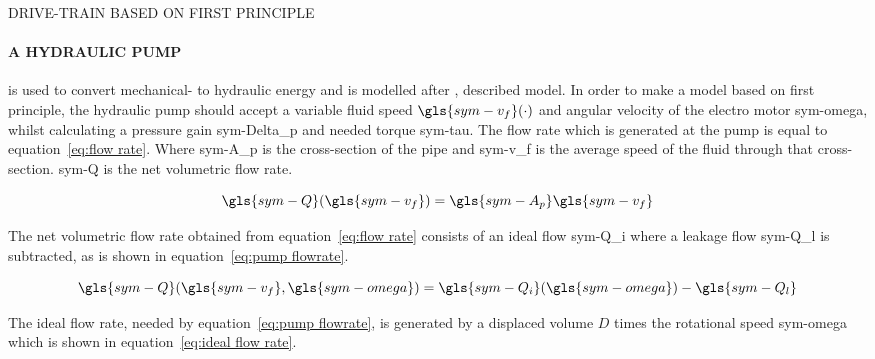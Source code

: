 \begin{RoyalFigure}[!htb, label=fig:propulsionsystemmodel]{DRIVE-TRAIN BASED ON FIRST PRINCIPLE}
\end{RoyalFigure}
\newpage

\paragraph{A HYDRAULIC PUMP} is used to convert mechanical- to hydraulic energy and is modelled after
\citet{mathworks_mechanical_hydraulic_2016}, described model. In order to make a model based on first principle, the
hydraulic pump should accept a variable fluid speed \( \gls{sym-v_f}(\cdot) \) and angular velocity of the electro
motor \gls{sym-omega}, whilst calculating a pressure gain \gls{sym-Delta_p} and needed torque \gls{sym-tau}. The flow
rate which is generated at the pump is equal to equation~\ref{eq:flow rate}. Where \gls{sym-A_p} is the cross-section of
the pipe and \gls{sym-v_f} is the average speed of the fluid through that cross-section. \gls{sym-Q} is the net
volumetric flow rate.

\begin{equation}
    \label{eq:flow rate}
    \gls{sym-Q}(\gls{sym-v_f}) = \gls{sym-A_p} \gls{sym-v_f}
\end{equation}

\noindent The net volumetric flow rate obtained from equation~\ref{eq:flow rate} consists of an ideal flow
\gls{sym-Q_i} where a leakage flow \gls{sym-Q_l} is subtracted, as is shown in equation~\ref{eq:pump flowrate}.

\begin{equation}
    \label{eq:pump flowrate}
    \gls{sym-Q}(\gls{sym-v_f}, \gls{sym-omega}) = \gls{sym-Q_i}(\gls{sym-omega}) - \gls{sym-Q_l}
\end{equation}

\noindent The ideal flow rate, needed by equation~\ref{eq:pump flowrate}, is generated by a displaced volume \( D \)
times the rotational speed \gls{sym-omega} which is shown in equation~\ref{eq:ideal flow rate}.

